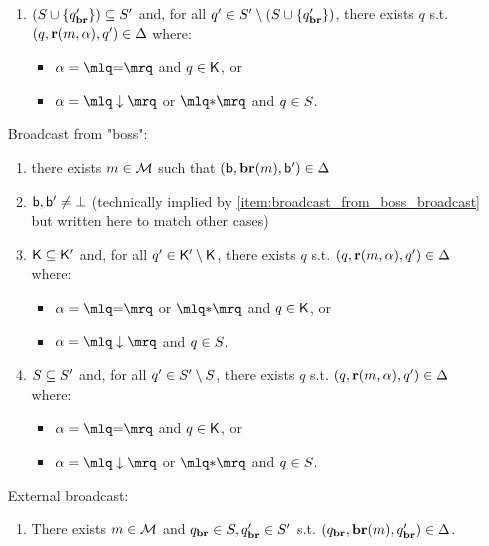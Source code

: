 \begin{definition}
\begin{enumerate}
\begin{enumerate}[label=(\roman*)]
		\item\label{item:broadcast_from_clique_covset}$(S \cup \{q_{\textbf{br}}'\}) \subseteq S'$ and, for all $q' \in S' \setminus (S \cup \{q_{\textbf{br}}'\})$, there exists $q$ s.t. $(q, \textbf{r}(m, \alpha), q') \in \Delta$ where:
		\begin{itemize}
			\item  $\anact = \quotemarks{\eqtestact}$ and $q \in \mathsf{K}$, or
			\item $\anact = \quotemarks{\enregact}$ or $\quotemarks{\dummyact}$ and $q \in S$.
		\end{itemize}
	\end{enumerate}
	\item[Broadcast from "boss":] 
	\begin{enumerate}[label=(\roman*)]
		\item \label{item:broadcast_from_boss_broadcast} there exists $m \in \mathcal{M}$ such that $(\mathsf{b}, \textbf{br}(m), \mathsf{b}') \in \Delta$
		
		\item\label{item:broadcast_from_boss_boss} $\mathsf{b}, \mathsf{b}' \ne \bot$ (technically implied by \ref{item:broadcast_from_boss_broadcast} but written here to match other cases)

		\item\label{item:broadcast_from_boss_clique} 	$\mathsf{K} \subseteq \mathsf{K}'$ and, for all $q' \in \mathsf{K}' \setminus \mathsf{K}$, there exists $q$ s.t. $(q, \textbf{r}(m, \alpha), q') \in \Delta$ where:
		\begin{itemize}
			\item $\anact = \quotemarks{\eqtestact}$ or $\quotemarks{\dummyact}$ and $q \in \mathsf{K}$, or
			\item $\anact= \quotemarks{\enregact}$ and $q \in S$.
		\end{itemize}
				
		\item\label{item:broadcast_from_boss_covset} $S \subseteq S'$  and, for all $q' \in S' \setminus S$, there exists $q$ s.t. $(q, \textbf{r}(m, \alpha), q') \in \Delta$ where:
		\begin{itemize}
			\item  $\anact = \quotemarks{\eqtestact}$ and $q \in \mathsf{K}$, or
			\item $\anact = \quotemarks{\enregact}$ or $\quotemarks{\dummyact}$ and $q \in S$.
		\end{itemize}
	\end{enumerate}
	\item[External broadcast:] 
	\begin{enumerate}[label=(\roman*)]
		\item\label{item:external_broadcast_broadcast} There exists $m \in \mathcal{M}$ and $q_{\textbf{br}} \in S, q_{\textbf{br}}' \in S'$ s.t. $(q_{\textbf{br}}, \textbf{br}(m), q_{\textbf{br}}') \in \Delta$. 
	

\end{enumerate}
\end{enumerate}
\end{definition}
